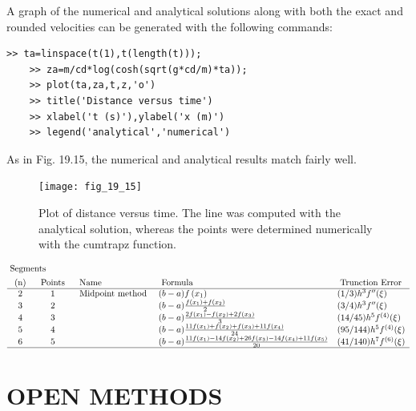 \documentclass[../main.tex]{subfiles}
\begin{document}
	A graph of the numerical and analytical solutions along with both the exact and rounded
velocities can be generated with the following commands:

\begin{lstlisting}[numbers=none]
	>> ta=linspace(t(1),t(length(t)));
	>> za=m/cd*log(cosh(sqrt(g*cd/m)*ta));
	>> plot(ta,za,t,z,'o')
	>> title('Distance versus time')
	>> xlabel('t (s)'),ylabel('x (m)')
	>> legend('analytical','numerical')
\end{lstlisting}
As in Fig. 19.15, the numerical and analytical results match fairly well. 

\begin{figure}[H]
    \centering
    \texttt{[image: fig\_19\_15]}
   \caption{\textsf{Plot of distance versus time. The line was computed with the analytical solution, whereas the
   points were determined numerically with the cumtrapz function.}}\label{fig:fig_19_15}
\end{figure}

$$
\begin{aligned}
&\text { Segments }\\
&\begin{array}{cclll}
\text { (n) } & \text { Points } & \text { Name } & \text { Formula } & \text { Trunction Error } \\
\hline 2 & 1 & \text { Midpoint method } &(b-a) f\left(x_{1}\right) & (1 / 3) h^{3} f^{\prime \prime}(\xi)\\
3 & 2 & &(b-a) \frac{f\left(x_{1}\right)+f\left(x_{2}\right)}{2} & (3 / 4) h^{3} f^{\prime \prime}(\xi)\\
4 & 3 & &(b-a) \frac{2 f\left(x_{1}\right)-f\left(x_{2}\right)+2 f\left(x_{3}\right)}{3} & (14 / 45) h^{5} f^{(4)}(\xi) \\
5 & 4 & &(b-a) \frac{11 f\left(x_{1}\right)+f\left(x_{2}\right)+f\left(x_{3}\right)+11 f\left(x_{4}\right)}{24} & (95 / 144) h^{5} f^{(4)}(\xi)\\
6 & 5 & &(b-a) \frac{11 f\left(x_{1}\right)-14 f\left(x_{2}\right)+26 f\left(x_{3}\right)-14 f\left(x_{4}\right)+11 f\left(x_{5}\right)}{20} & (41 / 140) h^{7} f^{(6)}(\xi)\\
\hline
\end{array}
\end{aligned}
$$

\section{OPEN METHODS}
\end{document}
